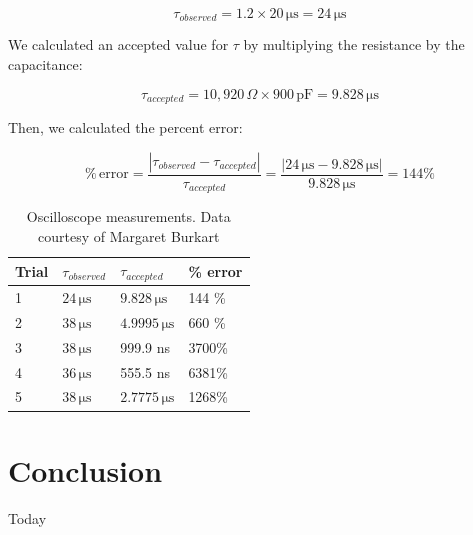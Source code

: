 \documentclass[11pt, titlepage, letterpaper, twoside]{article}
\begin{document}
$$
\tau_{observed} = 1.2 \times 20\,\mathrm{\mu s} = 24\,\mathrm{\mu s}
$$

We calculated an accepted value for $\tau$ by multiplying the resistance by the capacitance:

$$
\tau_{accepted} = 10,920\,\Omega \times 900\,\mathrm{pF} = 9.828\,\mathrm{\mu s}
$$

Then, we calculated the percent error:

$$
\mathrm{\%\,error} = \frac{\left| \tau_{observed} - \tau_{accepted} \right|}{\tau_{accepted}}
                   = \frac{\left| 24\,\mathrm{\mu s} - 9.828\,\mathrm{\mu s} \right|}{9.828\,\mathrm{\mu s}}
                   = 144 \%
$$

\begin{table}[h!]
\centering
\caption{Oscilloscope measurements. Data courtesy of Margaret Burkart}
\label{calculations}
\begin{tabular}{|l|l|l|l|}
\hline
Trial & $\tau_{observed}$    & $\tau_{accepted}$        & \% error \\ \hline
1     & $24\,\mathrm{\mu s}$ & $9.828\,\mathrm{\mu s}$  & 144 \%   \\ \hline
2     & $38\,\mathrm{\mu s}$ & $4.9995\,\mathrm{\mu s}$ & 660 \%   \\ \hline
3     & $38\,\mathrm{\mu s}$ & 999.9 ns                 & 3700\%   \\ \hline
4     & $36\,\mathrm{\mu s}$ & 555.5 ns                 & 6381\%   \\ \hline
5     & $38\,\mathrm{\mu s}$ & $2.7775\,\mathrm{\mu s}$ & 1268\%   \\ \hline
\end{tabular}
\end{table}


\section{Conclusion}
Today
\end{document}
